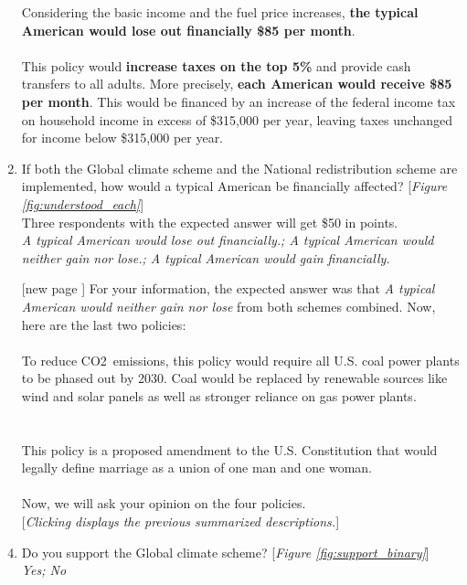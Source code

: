 \begin{enumerate}[resume]
Considering the basic income and the fuel price increases, \textbf{the typical American would lose out financially \$85 per month}.\\
\\
\textbf{} This policy would \textbf{increase taxes on the top 5\%} and provide cash transfers to all adults. More precisely, \textbf{each American would receive \$85 per month}. This would be financed by an increase of the federal income tax on household income in excess of \$315,000 per year, leaving taxes unchanged for income below \$315,000 per year.
\item \label{q:understood_both} If both the Global climate scheme and the National redistribution scheme are implemented, how would a typical American be financially affected? [\textit{Figure \ref{fig:understood_each}}] \\
Three respondents with the expected answer will get \$50 in points.
\\ \textit{A typical American would lose out financially.; A typical American would neither gain nor lose.; A typical American would gain financially.}
\item[[new page\!\!\!]] For your information, the expected answer was that \textit{A typical American would neither gain nor lose} from both schemes combined. Now, here are the last two policies:\\
\\
\textbf{} To reduce CO2~emissions, this policy would require all U.S. coal power plants to be phased out by 2030. Coal would be replaced by renewable sources like wind and solar panels as well as stronger reliance on gas power plants.\\
\\
\textbf{}\\
This policy is a proposed amendment to the U.S. Constitution that would legally define marriage as a union of one man and one woman.\\
\\
Now, we will ask your opinion on the four policies.\\
 [\textit{Clicking displays the previous summarized descriptions.}]
\item \label{q:gcs_support} Do you support the Global climate scheme? [\textit{Figure \ref{fig:support_binary}}]
\\ \textit{Yes; No}

\end{enumerate}
